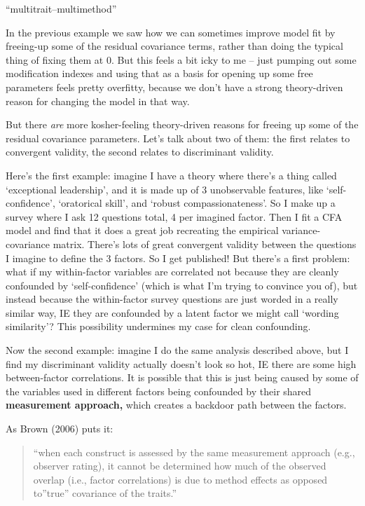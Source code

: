 \documentclass[
  letterpaper,
  DIV=11,
  numbers=noendperiod]{scrreprt}
\begin{document}
``multitrait--multimethod''

In the previous example we saw how we can sometimes improve model fit by
freeing-up some of the residual covariance terms, rather than doing the
typical thing of fixing them at 0. But this feels a bit icky to me --
just pumping out some modification indexes and using that as a basis for
opening up some free parameters feels pretty overfitty, because we don't
have a strong theory-driven reason for changing the model in that way.

But there \emph{are} more kosher-feeling theory-driven reasons for
freeing up some of the residual covariance parameters. Let's talk about
two of them: the first relates to convergent validity, the second
relates to discriminant validity.

Here's the first example: imagine I have a theory where there's a thing
called `exceptional leadership', and it is made up of 3 unobservable
features, like `self-confidence', `oratorical skill', and `robust
compassionateness'. So I make up a survey where I ask 12 questions
total, 4 per imagined factor. Then I fit a CFA model and find that it
does a great job recreating the empirical variance-covariance matrix.
There's lots of great convergent validity between the questions I
imagine to define the 3 factors. So I get published! But there's a first
problem: what if my within-factor variables are correlated not because
they are cleanly confounded by `self-confidence' (which is what I'm
trying to convince you of), but instead because the within-factor survey
questions are just worded in a really similar way, IE they are
confounded by a latent factor we might call `wording similarity'? This
possibility undermines my case for clean confounding.

Now the second example: imagine I do the same analysis described above,
but I find my discriminant validity actually doesn't look so hot, IE
there are some high between-factor correlations. It is possible that
this is just being caused by some of the variables used in different
factors being confounded by their shared \textbf{measurement approach,}
which creates a backdoor path between the factors.

As Brown (2006) puts it:

\begin{quote}
``when each construct is assessed by the same measurement approach
(e.g., observer rating), it cannot be determined how much of the
observed overlap (i.e., factor correlations) is due to method effects as
opposed to''true'' covariance of the traits.''
\end{quote}
\end{document}
